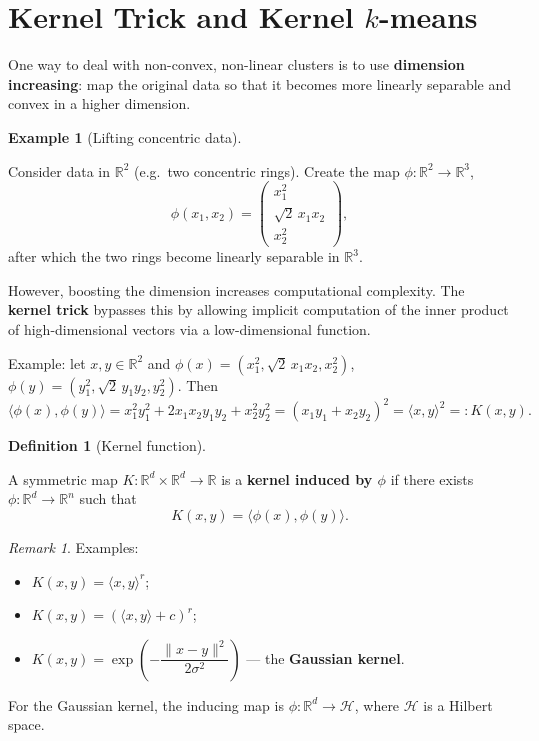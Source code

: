 \documentclass[
  letterpaper,
  DIV=11,
  numbers=noendperiod]{scrreprt}
\providecommand{\tightlist}{%
  \setlength{\itemsep}{0pt}\setlength{\parskip}{0pt}}
\theoremstyle{definition}
\newtheorem{definition}{Definition}[chapter]
\theoremstyle{plain}
\theoremstyle{plain}
\theoremstyle{definition}
\newtheorem{example}{Example}[chapter]
\theoremstyle{plain}
\theoremstyle{plain}
\theoremstyle{remark}
\newtheorem*{remark}{Remark}
\begin{document}
\section{\texorpdfstring{Kernel Trick and Kernel
\(k\)-means}{Kernel Trick and Kernel k-means}}\label{kernel-trick-and-kernel-k-means}

One way to deal with non-convex, non-linear clusters is to use
\textbf{dimension increasing}: map the original data so that it becomes
more linearly separable and convex in a higher dimension.

\begin{example}[Lifting concentric
data]\protect\hypertarget{exm-circle-lift}{}\label{exm-circle-lift}

Consider data in \(\mathbb{R}^2\) (e.g.~two concentric rings). Create
the map \(\phi : \mathbb{R}^2 \to \mathbb{R}^3\), \[
\phi(x_1, x_2) = \begin{pmatrix} x_1^2 \\ \sqrt{2}\, x_1 x_2 \\ x_2^2 \end{pmatrix},
\] after which the two rings become linearly separable in
\(\mathbb{R}^3\).

\end{example}

However, boosting the dimension increases computational complexity. The
\textbf{kernel trick} bypasses this by allowing implicit computation of
the inner product of high-dimensional vectors via a low-dimensional
function.

Example: let \(x, y \in \mathbb{R}^2\) and
\(\phi(x) = (x_1^2, \sqrt{2}\, x_1 x_2, x_2^2)\),
\(\phi(y) = (y_1^2, \sqrt{2}\, y_1 y_2, y_2^2)\). Then \[
\langle \phi(x), \phi(y)\rangle = x_1^2 y_1^2 + 2 x_1 x_2 y_1 y_2 + x_2^2 y_2^2 = (x_1 y_1 + x_2 y_2)^2 = \langle x, y\rangle^2 =: K(x, y).
\]

\begin{definition}[Kernel
function]\protect\hypertarget{def-kernel}{}\label{def-kernel}

A symmetric map \(K : \mathbb{R}^d \times \mathbb{R}^d \to \mathbb{R}\)
is a \textbf{kernel induced by \(\phi\)} if there exists
\(\phi : \mathbb{R}^d \to \mathbb{R}^n\) such that \[
K(x, y) = \langle \phi(x), \phi(y)\rangle .
\]

\end{definition}

\begin{remark}
Examples:

\begin{itemize}
\tightlist
\item
  \(K(x, y) = \langle x, y\rangle^r\);
\item
  \(K(x, y) = (\langle x, y\rangle + c)^r\);
\item
  \(K(x, y) = \exp\!\left(-\dfrac{\|x - y\|^2}{2\sigma^2}\right)\) ---
  the \textbf{Gaussian kernel}.
\end{itemize}

For the Gaussian kernel, the inducing map is
\(\phi : \mathbb{R}^d \to \mathcal{H}\), where \(\mathcal{H}\) is a
Hilbert space.
\end{remark}
\end{document}
